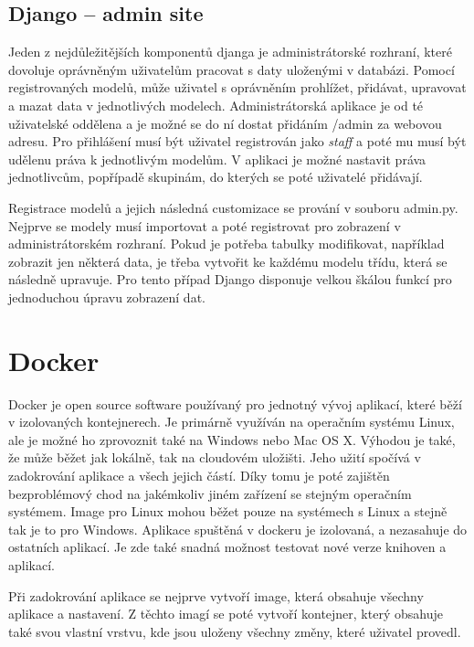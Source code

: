 \subsection{Django – admin site}

Jeden z nejdůležitějších komponentů djanga je administrátorské rozhraní, které dovoluje oprávněným uživatelům pracovat s daty uloženými v databázi. Pomocí registrovaných modelů, může uživatel s oprávněním prohlížet, přidávat, upravovat a mazat data v jednotlivých modelech. Administrátorská aplikace je od té uživatelské oddělena a je možné se do ní dostat přidáním /admin za webovou adresu. Pro přihlášení musí být uživatel registrován jako \textit{staff} a poté mu musí být udělenu práva k jednotlivým modelům. V aplikaci je možné nastavit práva jednotlivcům, popřípadě skupinám, do kterých se poté uživatelé přidávají. 

Registrace modelů a jejich následná customizace se prování v souboru admin.py. Nejprve se modely musí importovat a poté registrovat pro zobrazení v administrátorském rozhraní. Pokud je potřeba tabulky modifikovat, například zobrazit jen některá data, je třeba vytvořit ke každému modelu třídu, která se následně upravuje. Pro tento případ Django disponuje velkou škálou funkcí pro jednoduchou úpravu zobrazení dat.

\newpage

\section{Docker}

Docker je open source software používaný pro jednotný vývoj aplikací, které běží v izolovaných kontejnerech. Je primárně využíván na operačním systému Linux, ale je možné ho zprovoznit také na Windows nebo Mac OS X. Výhodou je také, že může běžet jak lokálně, tak na cloudovém uložišti. Jeho užití spočívá v zadokrování aplikace a všech jejich částí. Díky tomu je poté zajištěn bezproblémový chod na jakémkoliv jiném zařízení se stejným operačním systémem. Image pro Linux mohou běžet pouze na systémech s Linux a stejně tak je to pro Windows. Aplikace spuštěná v dockeru je izolovaná, a nezasahuje do ostatních aplikací. Je zde také snadná možnost testovat nové verze knihoven a aplikací.

Při zadokrování aplikace se nejprve vytvoří image, která obsahuje všechny aplikace a nastavení. Z těchto imagí se poté vytvoří kontejner, který obsahuje také svou vlastní vrstvu, kde jsou uloženy všechny změny, které uživatel provedl. 



